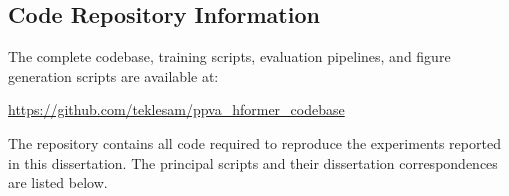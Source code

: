 \documentclass[12pt, a4paper, twoside, openright]{book}
\begin{document}
\begin{appendices}
\chapter{Code Repository Information}
\label{app:code}


The complete codebase, training scripts, evaluation pipelines, and figure generation scripts are available at:

\begin{center}
\url{https://github.com/teklesam/ppva_hformer_codebase}
\end{center}

\noindent The repository contains all code required to reproduce the experiments reported in this dissertation. The principal scripts and their dissertation correspondences are listed below.


\end{appendices}
\end{document}
